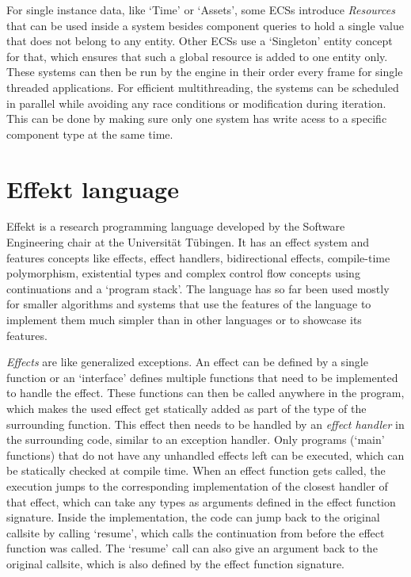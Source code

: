 For single instance data, like `Time' or `Assets', some ECSs introduce \textit{Resources} that can be used inside a system besides component queries to hold a single value that does not belong to any entity. Other ECSs use a `Singleton' entity concept for that, which ensures that such a global resource is added to one entity only. These systems can then be run by the engine in their order every frame for single threaded applications. For efficient multithreading, the systems can be scheduled in parallel while avoiding any race conditions or modification during iteration. This can be done by making sure only one system has write acess to a specific component type at the same time.

\section{Effekt language}

Effekt is a research programming language developed by the Software Engineering chair at the Universität Tübingen. It has an effect system and features concepts like effects, effect handlers, bidirectional effects, compile-time polymorphism, existential types and complex control flow concepts using continuations and a `program stack'. The language has so far been used mostly for smaller algorithms and systems that use the features of the language to implement them much simpler than in other languages or to showcase its features.

\textit{Effects} are like generalized exceptions. An effect can be defined by a single function or an `interface' defines multiple functions that need to be implemented to handle the effect. These functions can then be called anywhere in the program, which makes the used effect get statically added as part of the type of the surrounding function. This effect then needs to be handled by an \textit{effect handler} in the surrounding code, similar to an exception handler. Only programs (`main' functions) that do not have any unhandled effects left can be executed, which can be statically checked at compile time. When an effect function gets called, the execution jumps to the corresponding implementation of the closest handler of that effect, which can take any types as arguments defined in the effect function signature. Inside the implementation, the code can jump back to the original callsite by calling `resume', which calls the continuation from before the effect function was called. The `resume' call can also give an argument back to the original callsite, which is also defined by the effect function signature.

